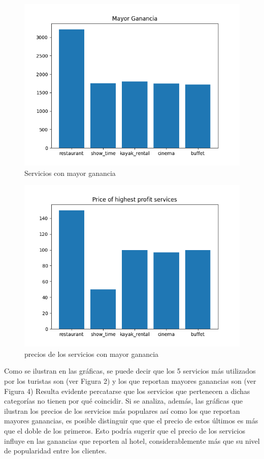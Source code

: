 \documentclass[12pt,a4paper]{article} \usepackage[spanish]{babel} \usepackage{graphicx} \usepackage{amsmath} \usepackage{amsfonts} \usepackage{amssymb} \usepackage{float} \usepackage{geometry}
\begin{document}
\begin{figure}[H] \centering \includegraphics[width=\textwidth]{Mayor Ganancia} \caption{Servicios con mayor ganancia} \label{fig:etiqueta} \end{figure}
\begin{figure}[H] \centering \includegraphics[width=\textwidth]{precio mayor ganancia} \caption{precios de los servicios con mayor ganancia} \label{fig:etiqueta} \end{figure}
Como se ilustran en las gráficas, se puede decir que los 5 servicios más utilizados por los turistas son (ver Figura 2)  y los que reportan mayores ganancias son (ver Figura 4) Resulta evidente percatarse que los servicios que pertenecen a dichas categorías no tienen por qué coincidir. Si se analiza, además, las gráficas que ilustran los precios de los servicios más populares así como los que reportan mayores ganancias, es posible distinguir que que el precio de estos últimos es más que el doble de los primeros. Esto podría sugerir que el precio de los servicios influye en las ganancias que reporten al hotel, considerablemente más que su nivel de popularidad entre los clientes.
\end{document}
